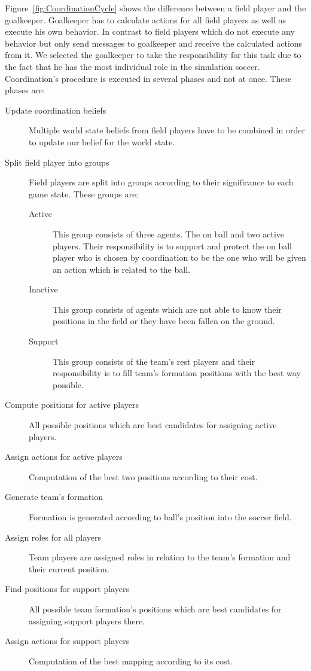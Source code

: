 Figure~\ref{fig:CoordinationCycle} shows the difference between a field player and the goalkeeper. Goalkeeper has to calculate actions for all field players as well as execute his own behavior. In contrast to field players which do not execute any behavior but only send messages to goalkeeper and receive the calculated actions from it. We selected the goalkeeper to take the responsibility for this task due to the fact that he has the most individual role in the simulation soccer. Coordination's procedure is executed in several phases and not at once. These phases are:
\begin{description}
\item[Update coordination beliefs] Multiple world state beliefs from field players have to be combined in order to update our belief for the world state.
\item[Split field player into groups] Field players are split into groups according to their significance to each game state. These groups are:
\begin{description}
\item[Active] This group consists of three agents. The on ball and two active players. Their responsibility is to support and protect the on ball player who is chosen by coordination to be the one who will be given an action which is related to the ball.
\item[Inactive] This group consists of agents which are not able to know their positions in the field or they have been fallen on the ground.
\item[Support] This group consists of the team's rest players and their responsibility is to fill team's formation positions with the best way possible.
\end{description}
\item[Compute positions for active players] All possible positions which are best candidates for assigning active players.
\item[Assign actions for active players] Computation of the best two positions according to their cost.
\item[Generate team's formation] Formation is generated according to ball's position into the soccer field.
\item[Assign roles for all players] Team players are assigned roles in relation to the team's formation and their current position.
\item[Find positions for support players] All possible team formation's positions which are best candidates for assigning support players there.
\item[Assign actions for support players] Computation of the best mapping according to its cost.
\end{description}


